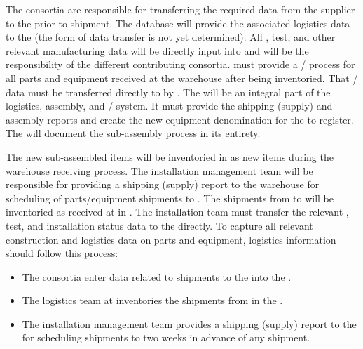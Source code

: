 The consortia are responsible for transferring the required data from the supplier to the  prior to shipment.  The  database will provide the associated logistics data to the  (the form of data transfer is not yet determined). 
All , %
test, and other relevant manufacturing data will be directly input into  and will be the responsibility of the different contributing consortia.  
 must provide a / process for all parts and equipment received at the warehouse after being inventoried. That / data must be transferred directly to  by .  The  will be an integral part of the logistics, assembly, and / system. It must provide the  shipping (supply) and assembly reports and create the new equipment denomination for the  to register.  The  will document the  sub-assembly process in its entirety. 

The new sub-assembled items will be inventoried in  as new items during the warehouse receiving process. 
The  installation management team will be responsible for providing a shipping (supply) report to the warehouse for scheduling of parts/equipment shipments to .
The shipments from  to  will be inventoried as received at  in . 
The  installation team must transfer the relevant , %
test, and installation status data to the  directly.
To capture all relevant construction and logistics data on parts and equipment, logistics information should follow this process:

\begin{itemize}
\item The consortia %
enter data related to %
shipments to the  into the .
\item The logistics team at  inventories the shipments from  %
in the .
\item The  installation management team %
provides a shipping (supply) report to the %
 for scheduling shipments %
to  two weeks in advance of any shipment.
\end{itemize}

